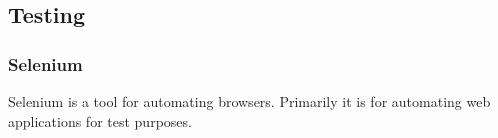 \subsection{Testing}

\subsubsection{Selenium}

	Selenium is a tool for automating browsers. Primarily it is for automating
	web applications for test purposes.
